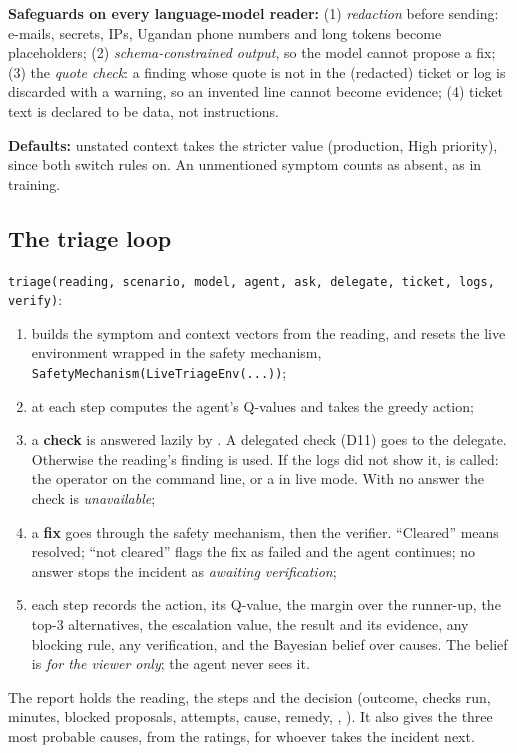 \documentclass[11pt,a4paper]{article}
\newcommand{\code}[1]{\path{#1}}
\begin{document}
\textbf{Safeguards on every language-model reader:}
(1) \emph{redaction} before sending: e-mails, secrets, IPs, Ugandan phone numbers and long tokens
become placeholders; (2) \emph{schema-constrained output}, so the model cannot propose a fix;
(3) the \emph{quote check}: a finding whose quote is not in the (redacted) ticket or log is
discarded with a warning, so an invented line cannot become evidence; (4) ticket text is
declared to be data, not instructions.

\textbf{Defaults:} unstated context takes the stricter value (production, High priority), since
both switch rules on. An unmentioned symptom counts as absent, as in training.

\subsection{The triage loop}
\texttt{triage(reading, scenario, model, agent, ask, delegate, ticket, logs, verify)}:
\begin{enumerate}
  \item builds the symptom and context vectors from the reading, and resets the live environment
        wrapped in the safety mechanism, \texttt{SafetyMechanism(LiveTriageEnv(...))};
  \item at each step computes the agent's Q-values and takes the greedy action;
  \item a \textbf{check} is answered lazily by \code{lookup}. A delegated check (D11) goes to the
        delegate. Otherwise the reading's finding is used. If the logs did not show it,
        \code{ask(check)} is called: the operator on the command line, or a \code{Probe} in
        live mode. With no answer the check is \emph{unavailable};
  \item a \textbf{fix} goes through the safety mechanism, then the verifier. ``Cleared'' means
        resolved; ``not cleared'' flags the fix as failed and the agent continues; no answer
        stops the incident as \emph{awaiting verification};
  \item each step records the action, its Q-value, the margin over the runner-up, the top-3
        alternatives, the escalation value, the result and its evidence, any blocking rule, any
        verification, and the Bayesian belief over causes. The belief is \emph{for the viewer
        only}; the agent never sees it.
\end{enumerate}
The report holds the reading, the steps and the decision (outcome, checks run, minutes, blocked
proposals, attempts, cause, remedy, \code{permitted}, \code{verified}). It also gives the three
most probable causes, from the ratings, for whoever takes the incident next.
\end{document}
